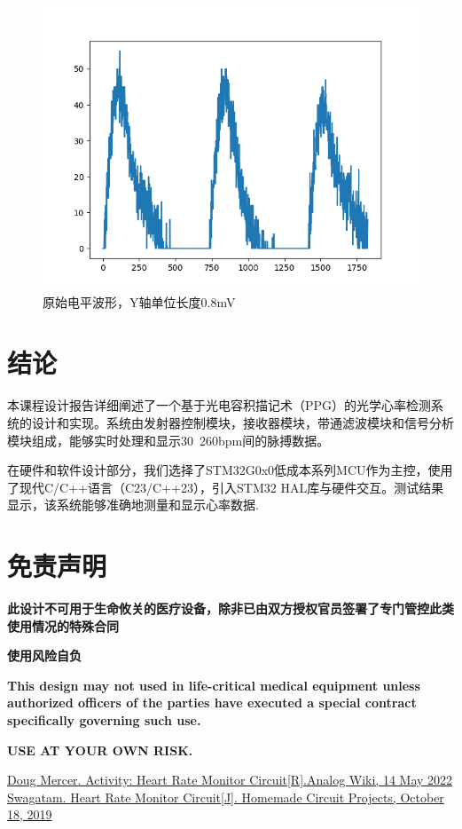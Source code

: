 \documentclass[a4paper]{ctexart}
\begin{document}
\begin{figure}[H]
	\centering
	\includegraphics[width=1.0\textwidth]{ppg.png}
	\caption{原始电平波形，Y轴单位长度0.8mV}
\end{figure}	


\newpage
\section{结论}
	
	本课程设计报告详细阐述了一个基于光电容积描记术（PPG）的光学心率检测系统的设计和实现。系统由发射器控制模块，接收器模块，带通滤波模块和信号分析模块组成，能够实时处理和显示30~260bpm间的脉搏数据。
	
	在硬件和软件设计部分，我们选择了STM32G0x0低成本系列MCU作为主控，使用了现代C/C++语言（C23/C++23），引入STM32 HAL库与硬件交互。测试结果显示，该系统能够准确地测量和显示心率数据.

\section{免责声明}
	\textbf{此设计不可用于生命攸关的医疗设备，除非已由双方授权官员签署了专门管控此类使用情况的特殊合同}
	
	\textbf{使用风险自负}
	
	\textbf{This design may not used in life-critical medical equipment unless authorized officers of the parties have executed a special contract specifically governing such use.}
	
	\textbf{USE AT YOUR OWN RISK.}


\newpage
\begin{thebibliography}{20}
	\href{https://wiki.analog.com/university/courses/alm1k/alm-lab-heart-rate-mon}{Doug Mercer. Activity: Heart Rate Monitor Circuit[R].Analog Wiki, 14 May 2022}
	\href{https://www.homemade-circuits.com/heart-rate-monitor-alarm-circuit/}{Swagatam. Heart Rate Monitor Circuit[J]. Homemade Circuit Projects, October 18, 2019}
\end{thebibliography}
\end{document}
